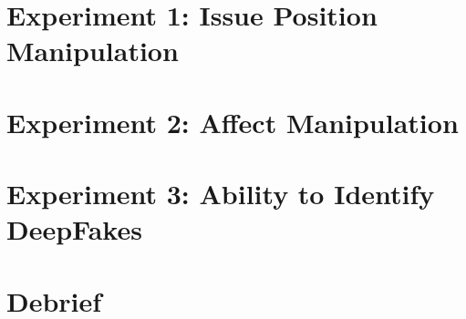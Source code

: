 \documentclass[12pt]{article}
\begin{document}
\section{Experiment 1: Issue Position Manipulation}


\section{Experiment 2: Affect Manipulation}


\section{Experiment 3: Ability to Identify DeepFakes}


\section{Debrief}


\printbibliography
\end{document}
